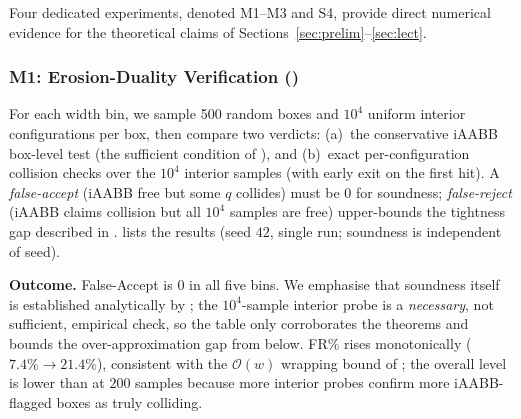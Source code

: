 \documentclass[journal]{IEEEtran}
\begin{document}
Four dedicated experiments, denoted M1--M3 and S4, provide direct
numerical evidence for the theoretical claims of
Sections~\ref{sec:prelim}--\ref{sec:lect}.

\subsubsection{M1: Erosion-Duality Verification
()}
For each width bin, we sample 500 random boxes and $10^{4}$ uniform
interior configurations per box, then compare two verdicts:
(a)~the conservative iAABB box-level test (the sufficient condition
of ), and (b)~exact per-configuration collision
checks over the $10^{4}$ interior samples (with early exit on the
first hit).
A \emph{false-accept} (iAABB free but some $q$ collides) must be $0$
for soundness; \emph{false-reject} (iAABB claims collision but all
$10^{4}$ samples are free) upper-bounds the tightness gap described
in .  lists the results
(seed $42$, single run; soundness is independent of seed).

\begin{table}[ht]
\centering
\caption{Erosion-duality verification (M1).}
\label{tab:m1_erosion}
\end{table}

\textbf{Outcome.} False-Accept is $0$ in all five bins. We emphasise
that soundness itself is established analytically by
; the $10^{4}$-sample interior probe is
a \emph{necessary}, not sufficient, empirical check, so the table only
corroborates the theorems and bounds the over-approximation gap from
below. FR\% rises monotonically ($7.4\%\!\to\!21.4\%$), consistent
with the $\mathcal{O}(w)$ wrapping bound of ; the
overall level is lower than at $200$ samples because more interior
probes confirm more iAABB-flagged boxes as truly colliding.
\end{document}
